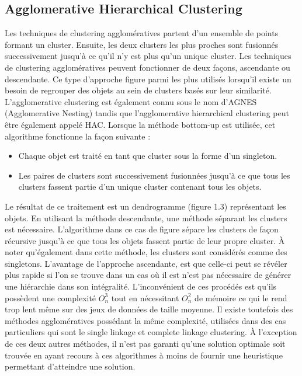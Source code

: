 \documentclass[memoire.tex]{subfiles}
\begin{document}
\subsection{Agglomerative Hierarchical Clustering}

Les techniques de clustering agglomératives partent d'un ensemble de points formant un cluster. Ensuite, les deux clusters les plus proches sont fusionnés successivement jusqu'à ce qu'il n'y est plus qu'un unique cluster. \cite{ref4}
Les techniques de clustering agglomératives peuvent fonctionner de deux façons, ascendante ou descendante. Ce type d’approche figure parmi les plus utilisés lorsqu’il existe un besoin de regrouper des objets au sein de clusters basés sur leur similarité. L’agglomerative clustering est également connu sous le nom d’AGNES (Agglomerative Nesting) tandis que l’agglomerative hierarchical clustering peut être également appelé HAC. Lorsque la méthode bottom-up est utilisée, cet algorithme fonctionne la façon suivante :
\begin{itemize}
\item Chaque objet est traité en tant que cluster sous la forme d’un singleton.
\item Les paires de clusters sont successivement fusionnées jusqu’à ce que tous les clusters fassent partie d’un unique cluster contenant tous les objets.
\end{itemize}
Le résultat de ce traitement est un dendrogramme (figure 1.3) représentant les objets.\cite{ref10} En utilisant la méthode descendante, une méthode séparant les clusters est nécessaire. L’algorithme dans ce cas de figure sépare les clusters de façon récursive jusqu’à ce que tous les objets fassent partie de leur propre cluster. À noter qu’également dans cette méthode, les clusters sont considérés comme des singletons. L’avantage de l’approche ascendante, est que celle-ci peut se révéler plus rapide si l’on se trouve dans un cas où il est n’est pas nécessaire de générer une hiérarchie dans son intégralité.\cite{ref16}
L’inconvénient de ces procédés est qu’ils possèdent une complexité $O_{n}^3$ tout en nécessitant $O_{n}^2$ de mémoire ce qui le rend trop lent même sur des jeux de données de taille moyenne. Il existe toutefois des méthodes agglomératives possédant la même complexité, utilisées dans des cas particuliers qui sont le single linkage et complete linkage clustering. À l’exception de ces deux autres méthodes, il n’est pas garanti qu’une solution optimale soit trouvée en ayant recours à ces algorithmes à moins de fournir une heuristique permettant d’atteindre une solution.
\end{document}

